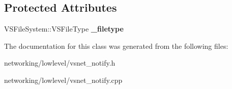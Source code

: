 \subsection*{Protected Attributes}
\begin{DoxyCompactItemize}
\item 
V\+S\+File\+System\+::\+V\+S\+File\+Type {\bfseries \+\_\+filetype}\hypertarget{classVsnetDownload_1_1Client_1_1Item_a686ffe35420537c86e0273148ed3ceb7}{}\label{classVsnetDownload_1_1Client_1_1Item_a686ffe35420537c86e0273148ed3ceb7}

\end{DoxyCompactItemize}


The documentation for this class was generated from the following files\+:\begin{DoxyCompactItemize}
\item 
networking/lowlevel/vsnet\+\_\+notify.\+h\item 
networking/lowlevel/vsnet\+\_\+notify.\+cpp\end{DoxyCompactItemize}
